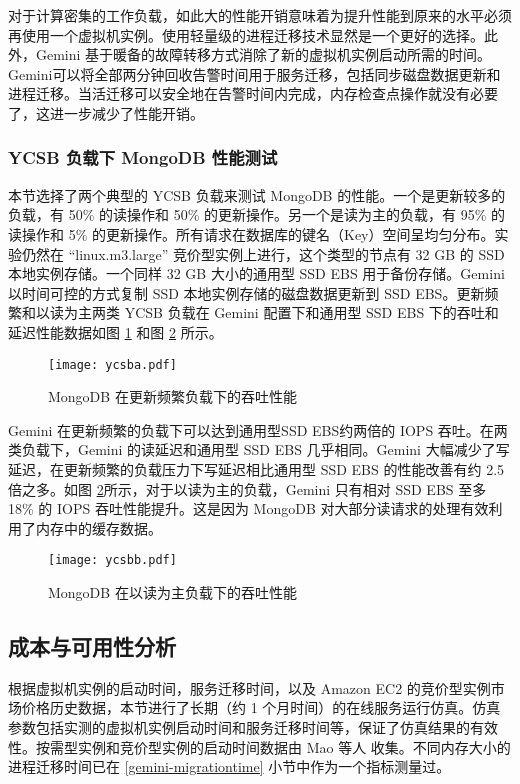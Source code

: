 对于计算密集的工作负载，如此大的性能开销意味着为提升性能到原来的水平必须再使用一个虚拟机实例。使用轻量级的进程迁移技术显然是一个更好的选择。此外，Gemini 基于暖备的故障转移方式消除了新的虚拟机实例启动所需的时间。Gemini可以将全部两分钟回收告警时间用于服务迁移，包括同步磁盘数据更新和进程迁移。当活迁移可以安全地在告警时间内完成，内存检查点操作就没有必要了，这进一步减少了性能开销。

\subsubsection{YCSB 负载下 MongoDB 性能测试}
本节选择了两个典型的 YCSB 负载来测试 MongoDB 的性能。一个是更新较多的负载，有 50\% 的读操作和 50\% 的更新操作。另一个是读为主的负载，有 95\% 的读操作和 5\% 的更新操作。所有请求在数据库的键名（Key）空间呈均匀分布。实验仍然在 ``linux.m3.large'' 竞价型实例上进行，这个类型的节点有 32 GB 的 SSD 本地实例存储。一个同样 32 GB 大小的通用型 SSD EBS 用于备份存储。Gemini 以时间可控的方式复制 SSD 本地实例存储的磁盘数据更新到 SSD EBS。更新频繁和以读为主两类 YCSB 负载在 Gemini 配置下和通用型 SSD EBS 下的吞吐和延迟性能数据如图 \ref{figure:ycsba} 和图 \ref{figure:ycsbb} 所示。
\begin{figure}[]
  \centering
  \texttt{[image: ycsba.pdf]}
  \caption{MongoDB 在更新频繁负载下的吞吐性能}
  \label{figure:ycsba}
\end{figure}

Gemini 在更新频繁的负载下可以达到通用型SSD EBS约两倍的 IOPS 吞吐。在两类负载下，Gemini 的读延迟和通用型 SSD EBS 几乎相同。Gemini 大幅减少了写延迟，在更新频繁的负载压力下写延迟相比通用型 SSD EBS 的性能改善有约 2.5 倍之多。如图 \ref{figure:ycsbb}所示，对于以读为主的负载，Gemini 只有相对 SSD EBS 至多 18\% 的 IOPS 吞吐性能提升。这是因为 MongoDB 对大部分读请求的处理有效利用了内存中的缓存数据。
\begin{figure}[]
  \centering
  \texttt{[image: ycsbb.pdf]}
  \caption{MongoDB 在以读为主负载下的吞吐性能}
  \label{figure:ycsbb}
\end{figure}

\subsection{成本与可用性分析}
根据虚拟机实例的启动时间，服务迁移时间，以及 Amazon EC2 的竞价型实例市场价格历史数据，本节进行了长期（约 1 个月时间）的在线服务运行仿真。仿真参数包括实测的虚拟机实例启动时间和服务迁移时间等，保证了仿真结果的有效性。按需型实例和竞价型实例的启动时间数据由 Mao 等人 \cite{Mao:2012:PSV:2353730.2353859} 收集。不同内存大小的进程迁移时间已在 \ref{gemini-migrationtime} 小节中作为一个指标测量过。

